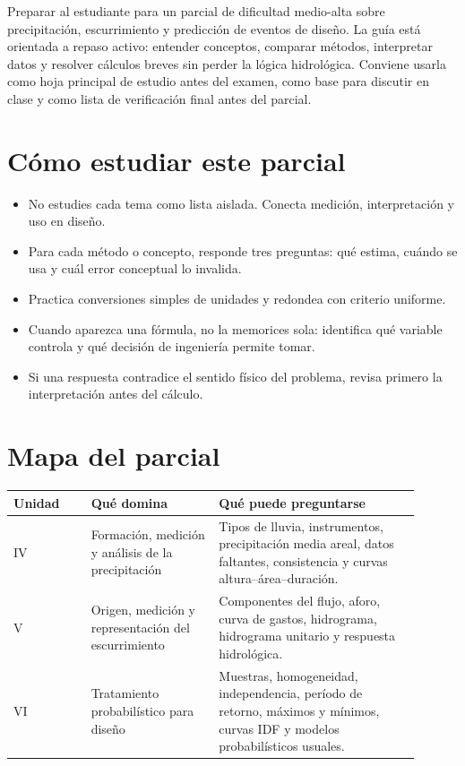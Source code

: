 \documentclass[11pt]{article}
\begin{document}

\handoutintro
{Preparar al estudiante para un parcial de dificultad medio-alta sobre precipitación, escurrimiento y predicción de eventos de diseño. La guía está orientada a repaso activo: entender conceptos, comparar métodos, interpretar datos y resolver cálculos breves sin perder la lógica hidrológica.}
{Conviene usarla como hoja principal de estudio antes del examen, como base para discutir en clase y como lista de verificación final antes del parcial.}

\section{Cómo estudiar este parcial}
\begin{itemize}
\item No estudies cada tema como lista aislada. Conecta medición, interpretación y uso en diseño.
\item Para cada método o concepto, responde tres preguntas: qué estima, cuándo se usa y cuál error conceptual lo invalida.
\item Practica conversiones simples de unidades y redondea con criterio uniforme.
\item Cuando aparezca una fórmula, no la memorices sola: identifica qué variable controla y qué decisión de ingeniería permite tomar.
\item Si una respuesta contradice el sentido físico del problema, revisa primero la interpretación antes del cálculo.
\end{itemize}

\section{Mapa del parcial}
\begin{center}
\begin{tabular}{p{0.17\linewidth} p{0.29\linewidth} p{0.44\linewidth}}
\toprule
\textbf{Unidad} & \textbf{Qué domina} & \textbf{Qué puede preguntarse} \\
\midrule
IV & Formación, medición y análisis de la precipitación & Tipos de lluvia, instrumentos, precipitación media areal, datos faltantes, consistencia y curvas altura--área--duración. \\
V & Origen, medición y representación del escurrimiento & Componentes del flujo, aforo, curva de gastos, hidrograma, hidrograma unitario y respuesta hidrológica. \\
VI & Tratamiento probabilístico para diseño & Muestras, homogeneidad, independencia, período de retorno, máximos y mínimos, curvas IDF y modelos probabilísticos usuales. \\
\bottomrule
\end{tabular}
\end{center}
\end{document}
